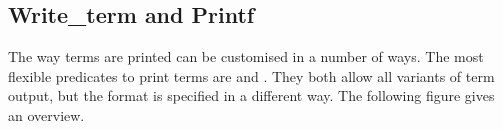\subsection{Write_term and Printf}

The way {\eclipse} terms are printed can be customised in a number of ways.
The most flexible predicates to print terms are
and
.
They both allow all variants of term output, but the format is
specified in a different way.
The following figure gives an overview.
\vfill %

\newlength{\WidthOne}
\newlength{\WidthTwo}\settowidth{\WidthTwo}{char~for}
\newlength{\WidthThree}\setlength{\WidthThree}{\textwidth}%
\addtolength{\WidthThree}{-\WidthOne}%
\addtolength{\WidthThree}{-\WidthTwo}%
\addtolength{\WidthThree}{-36pt}
